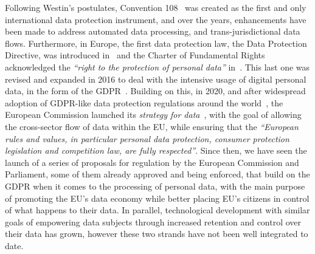 Following Westin's postulates, Convention 108~\citep{council_of_europe_convention_1981} was created as the first and only international data protection instrument, and over the years, enhancements have been made to address automated data processing, and trans-jurisdictional data flows.
Furthermore, in Europe, the first data protection law, the Data Protection Directive, was introduced in~\citeyear{noauthor_directive_1995} and the Charter of Fundamental Rights acknowledged the \textit{``right to the protection of personal data''} in~\citeyear{noauthor_charter_2000}.
This last one was revised and expanded in 2016 to deal with the intensive usage of digital personal data, in the form of the GDPR~\citeyearpar{noauthor_regulation_2016}.
Building on this, in 2020, and after widespread adoption of GDPR-like data protection regulations around the world~\citep{bradford_brussels_2019}, the European Commission launched its \textit{strategy for data}~\citep{european_commission_communication_2020}, with the goal of allowing the cross-sector flow of data within the EU, while ensuring that the \textit{``European rules and values, in particular personal data protection, consumer protection legislation and competition law, are fully respected''}.
Since then, we have seen the launch of a series of proposals for regulation by the European Commission and Parliament, some of them already approved and being enforced, that build on the GDPR when it comes to the processing of personal data, with the main purpose of promoting the EU's data economy while better placing EU's citizens in control of what happens to their data.
In parallel, technological development with similar goals of empowering data subjects through increased retention and control over their data has grown, however these two strands have not been well integrated to date.






